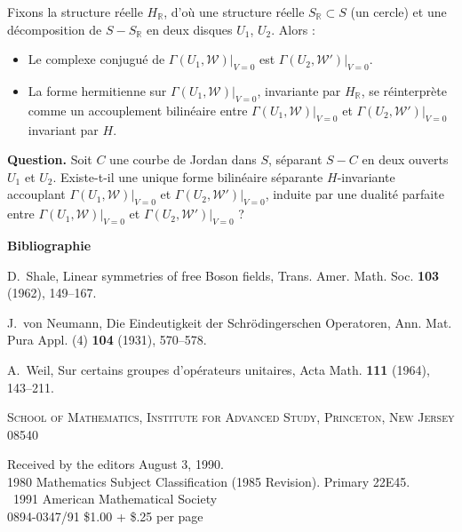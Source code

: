 \documentclass[12pt,a4paper]{article}
\theoremstyle{plain}
\theoremstyle{definition}
\theoremstyle{remark}
\begin{document}
Fixons la structure réelle $H_\mathbb{R}$, d'où une structure réelle $S_\mathbb{R} \subset S$ (un cercle) et une décomposition de $S - S_\mathbb{R}$ en deux disques $U_1$, $U_2$. Alors :
\begin{itemize}
\item[(a)] Le complexe conjugué de $\Gamma(U_1, \mathscr{W})|_{V=0}$ est $\Gamma(U_2, \mathscr{W}')|_{V=0}$.
\item[(b)] La forme hermitienne sur $\Gamma(U_1, \mathscr{W})|_{V=0}$, invariante par $H_\mathbb{R}$, se réinterprète comme un accouplement bilinéaire entre $\Gamma(U_1, \mathscr{W})|_{V=0}$ et $\Gamma(U_2, \mathscr{W}')|_{V=0}$ invariant par $H$.
\end{itemize}

\medskip
\noindent\textbf{Question.} Soit $C$ une courbe de Jordan dans $S$, séparant $S - C$ en deux ouverts $U_1$ et $U_2$. Existe-t-il une unique forme bilinéaire séparante $H$-invariante accouplant $\Gamma(U_1, \mathscr{W})|_{V=0}$ et $\Gamma(U_2, \mathscr{W}')|_{V=0}$, induite par une dualité parfaite entre $\Gamma(U_1, \mathscr{W})|_{V=0}$ et $\Gamma(U_2, \mathscr{W}')|_{V=0}$ ?

\vspace{2em}

\noindent\textbf{Bibliographie}

\begin{enumerate}[label={[\arabic*]}]
\item D.~Shale, Linear symmetries of free Boson fields, Trans. Amer. Math. Soc. \textbf{103} (1962), 149--167.
\item J.~von Neumann, Die Eindeutigkeit der Schrödingerschen Operatoren, Ann. Mat. Pura Appl. (4) \textbf{104} (1931), 570--578.
\item A.~Weil, Sur certains groupes d'opérateurs unitaires, Acta Math. \textbf{111} (1964), 143--211.
\end{enumerate}

\vspace{1em}

\begin{flushleft}
\small\textsc{School of Mathematics, Institute for Advanced Study, Princeton, New Jersey 08540}
\end{flushleft}

\vspace{2em}

\begin{flushleft}
\small Received by the editors August 3, 1990.\\
\small 1980 Mathematics Subject Classification (1985 Revision). Primary 22E45.\\
\small \textcopyright\ 1991 American Mathematical Society\\
\small 0894-0347/91 \$1.00 + \$.25 per page
\end{flushleft}
\end{document}
